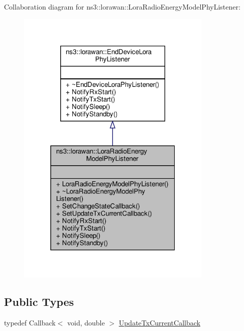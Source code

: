 Collaboration diagram for ns3\+:\+:lorawan\+:\+:Lora\+Radio\+Energy\+Model\+Phy\+Listener\+:
\nopagebreak
\begin{figure}[H]
\begin{center}
\leavevmode
\includegraphics[width=265pt]{classns3_1_1lorawan_1_1LoraRadioEnergyModelPhyListener__coll__graph}
\end{center}
\end{figure}
\subsection*{Public Types}
\begin{DoxyCompactItemize}
\item 
typedef Callback$<$ void, double $>$ \hyperlink{classns3_1_1lorawan_1_1LoraRadioEnergyModelPhyListener_a6e0dbc535ae92d41bf4699ca6d97d229}{Update\+Tx\+Current\+Callback}
\end{DoxyCompactItemize}

